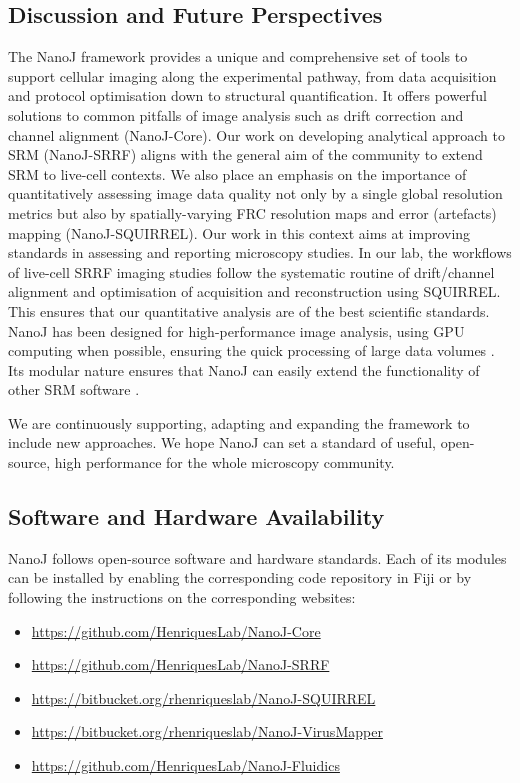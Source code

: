 \subsection*{Discussion and Future Perspectives}
 The NanoJ framework provides a unique and comprehensive set of tools to support cellular imaging along the experimental pathway, from data acquisition and protocol optimisation down to  structural quantification. It offers powerful solutions to common pitfalls of image analysis such as drift correction and channel alignment (NanoJ-Core). Our work on developing analytical approach to SRM (NanoJ-SRRF) aligns with the general aim of the community to extend SRM to live-cell contexts. We also place an emphasis on the importance of quantitatively assessing image data quality not only by a single global resolution metrics but also by spatially-varying FRC resolution maps and error (artefacts) mapping (NanoJ-SQUIRREL). Our work in this context aims at improving standards in assessing and reporting microscopy studies. In our lab, the workflows of live-cell SRRF imaging studies follow the systematic routine of drift/channel alignment and optimisation of acquisition and reconstruction using SQUIRREL. This ensures that our quantitative analysis are of the best scientific standards. NanoJ has been designed for high-performance image analysis, using GPU computing when possible, ensuring the quick processing of large data volumes \cite{herbert2012single,pereira2015high,almada2015palm,beghin2017localization,douglass2016super}. Its modular nature ensures that NanoJ can easily extend the functionality of other SRM software  \cite{sage2018super,weigert2017content,henriques2010quickpalm}. 
 
 We are continuously supporting, adapting and expanding the framework to include new approaches. We hope NanoJ can set a standard of useful, open-source, high performance for the whole microscopy community.
 
\subsection*{Software and Hardware Availability}
 NanoJ follows open-source software and hardware standards. Each of its modules can be installed by enabling the corresponding code repository in Fiji or by following the instructions on the corresponding websites:
 \small
 \begin{itemize}
  \item \href{https://github.com/HenriquesLab/NanoJ-Core}{https://github.com/HenriquesLab/NanoJ-Core}
  \item \href{https://github.com/HenriquesLab/NanoJ-SRRF}{https://github.com/HenriquesLab/NanoJ-SRRF}
  \item \href{https://bitbucket.org/rhenriqueslab/nanoj-squirrel}{https://bitbucket.org/rhenriqueslab/NanoJ-SQUIRREL}
  \item \href{https://bitbucket.org/rhenriqueslab/NanoJ-VirusMapper}{https://bitbucket.org/rhenriqueslab/NanoJ-VirusMapper}
  \item \href{https://github.com/HenriquesLab/NanoJ-Fluidics}{https://github.com/HenriquesLab/NanoJ-Fluidics}
\end{itemize}


